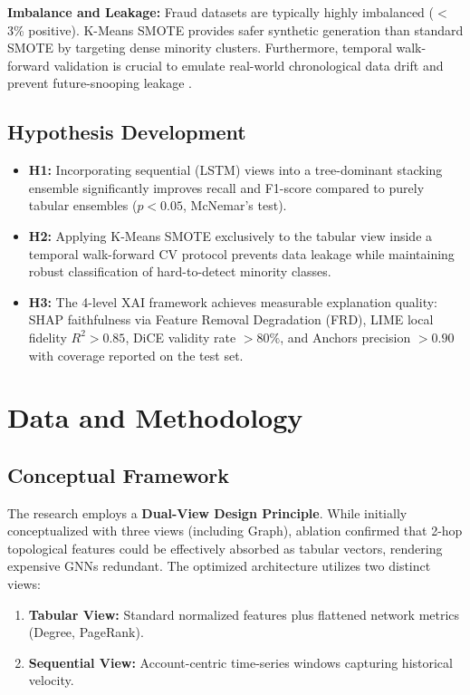 \documentclass[10pt,a4paper,twocolumn]{article}
\begin{document}
\textbf{Imbalance and Leakage:} Fraud datasets are typically highly imbalanced ($<$3\% positive). K-Means SMOTE \cite{chawla2002} provides safer synthetic generation than standard SMOTE by targeting dense minority clusters. Furthermore, temporal walk-forward validation is crucial to emulate real-world chronological data drift and prevent future-snooping leakage \cite{li2018}.

\subsection{Hypothesis Development}
\begin{itemize}
    \item \textbf{H1:} Incorporating sequential (LSTM) views into a tree-dominant stacking ensemble significantly improves recall and F1-score compared to purely tabular ensembles ($p < 0.05$, McNemar's test).
    \item \textbf{H2:} Applying K-Means SMOTE exclusively to the tabular view inside a temporal walk-forward CV protocol prevents data leakage while maintaining robust classification of hard-to-detect minority classes.
    \item \textbf{H3:} The 4-level XAI framework achieves measurable explanation quality: SHAP faithfulness via Feature Removal Degradation (FRD), LIME local fidelity $R^2 > 0.85$, DiCE validity rate $> 80\%$, and Anchors precision $> 0.90$ with coverage reported on the test set.
\end{itemize}

\section{Data and Methodology}
\subsection{Conceptual Framework}
The research employs a \textbf{Dual-View Design Principle}. While initially conceptualized with three views (including Graph), ablation confirmed that 2-hop topological features could be effectively absorbed as tabular vectors, rendering expensive GNNs redundant. The optimized architecture utilizes two distinct views:
\begin{enumerate}
    \item \textbf{Tabular View:} Standard normalized features plus flattened network metrics (Degree, PageRank).
    \item \textbf{Sequential View:} Account-centric time-series windows capturing historical velocity.
\end{enumerate}
\end{document}
